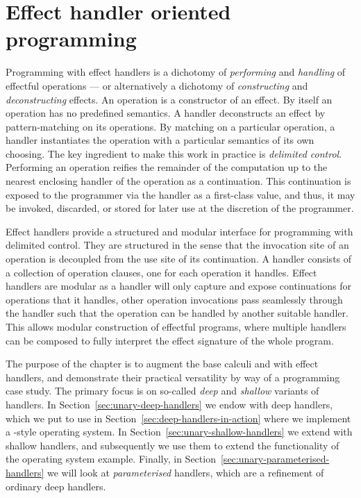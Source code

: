 \documentclass[12pt,phd,lfcs,twoside,openright,logo,leftchapter,normalheadings]{infthesis}
\theoremstyle{plain}
\theoremstyle{definition}
\begin{document}
\chapter{Effect handler oriented programming}
\label{ch:unary-handlers}
%
Programming with effect handlers is a dichotomy of \emph{performing}
and \emph{handling} of effectful operations --- or alternatively a
dichotomy of \emph{constructing} and \emph{deconstructing} effects. An
operation is a constructor of an effect. By itself an operation has no
predefined semantics. A handler deconstructs an effect by
pattern-matching on its operations. By matching on a particular
operation, a handler instantiates the operation with a particular
semantics of its own choosing. The key ingredient to make this work in
practice is \emph{delimited control}. Performing an operation reifies
the remainder of the computation up to the nearest enclosing handler
of the operation as a continuation. This continuation is exposed to
the programmer via the handler as a first-class value, and thus, it
may be invoked, discarded, or stored for later use at the discretion
of the programmer.

Effect handlers provide a structured and modular interface for
programming with delimited control. They are structured in the sense
that the invocation site of an operation is decoupled from the use
site of its continuation. A handler consists of a collection of
operation clauses, one for each operation it handles. Effect handlers
are modular as a handler will only capture and expose continuations
for operations that it handles, other operation invocations pass
seamlessly through the handler such that the operation can be handled
by another suitable handler. This allows modular construction of
effectful programs, where multiple handlers can be composed to fully
interpret the effect signature of the whole program.

%
The purpose of the chapter is to augment the base calculi \BCalc{} and
\BCalcRec{} with effect handlers, and demonstrate their practical
versatility by way of a programming case study. The primary focus is
on so-called \emph{deep} and \emph{shallow} variants of handlers. In
Section~\ref{sec:unary-deep-handlers} we endow \BCalc{} with deep
handlers, which we put to use in
Section~\ref{sec:deep-handlers-in-action} where we implement a
\UNIX{}-style operating system. In
Section~\ref{sec:unary-shallow-handlers} we extend \BCalcRec{} with
shallow handlers, and subsequently we use them to extend the
functionality of the operating system example. Finally, in
Section~\ref{sec:unary-parameterised-handlers} we will look at
\emph{parameterised} handlers, which are a refinement of ordinary deep
handlers.
\end{document}
